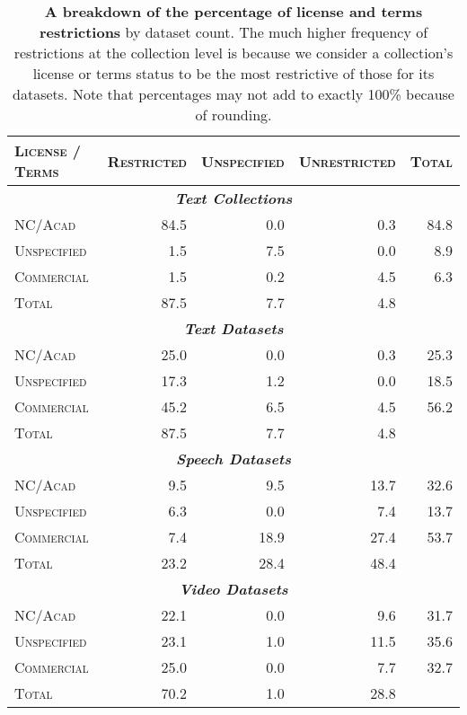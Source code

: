 \begin{table*}[!htb]
\centering
\begin{adjustbox}{width=0.9\textwidth}
\begin{tabular}{l|rrr|r}
\toprule
\textsc{License / Terms} & \textsc{Restricted} & \textsc{Unspecified} & \textsc{Unrestricted} & \textsc{Total} \\
\midrule
\multicolumn{5}{c}{\textbf{\emph{Text Collections}}} \\
\midrule
\textsc{NC/Acad} & 84.5 & 0.0 & 0.3 & 84.8 \\
\textsc{Unspecified} & 1.5 & 7.5 & 0.0 & 8.9 \\
\textsc{Commercial} & 1.5 & 0.2 & 4.5 & 6.3 \\
\midrule
\textsc{Total} & 87.5 & 7.7 & 4.8 &  \\
\midrule
\multicolumn{5}{c}{\textbf{\emph{Text Datasets}}} \\
\midrule
\textsc{NC/Acad} & 25.0 & 0.0 & 0.3 & 25.3 \\
\textsc{Unspecified} & 17.3 & 1.2 & 0.0 & 18.5 \\
\textsc{Commercial} & 45.2 & 6.5 & 4.5 & 56.2 \\
\midrule
\textsc{Total} & 87.5 & 7.7 & 4.8 &  \\
\midrule
\multicolumn{5}{c}{\textbf{\emph{Speech Datasets}}} \\
\midrule
\textsc{NC/Acad} & 9.5 & 9.5 & 13.7 & 32.6 \\
\textsc{Unspecified} & 6.3 & 0.0 & 7.4 & 13.7 \\
\textsc{Commercial} & 7.4 & 18.9 & 27.4 & 53.7 \\
\midrule
\textsc{Total} & 23.2 & 28.4 & 48.4 &  \\
\midrule
\multicolumn{5}{c}{\textbf{\emph{Video Datasets}}} \\
\midrule
\textsc{NC/Acad} & 22.1 & 0.0 & 9.6 & 31.7 \\
\textsc{Unspecified} & 23.1 & 1.0 & 11.5 & 35.6 \\
\textsc{Commercial} & 25.0 & 0.0 & 7.7 & 32.7 \\
\midrule
\textsc{Total} & 70.2 & 1.0 & 28.8 & \\
\bottomrule
\end{tabular}
\end{adjustbox}
\caption{\textbf{A breakdown of the percentage of license and terms restrictions} by dataset count. The much higher frequency of restrictions at the collection level is because we consider a collection's license or terms status to be the most restrictive of those for its datasets. Note that percentages may not add to exactly 100\% because of rounding.
}
\label{tab:license_terms_breakdown_count}
\vspace{-2mm}
\end{table*}
